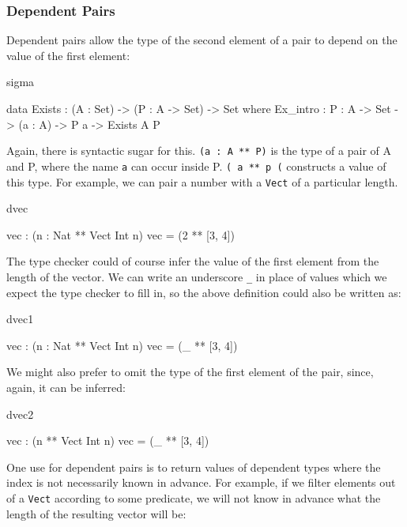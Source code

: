 \subsubsection*{Dependent Pairs}

Dependent pairs allow the type of the second element of a pair to depend on
the value of the first element:

\begin{SaveVerbatim}{sigma}

data Exists : (A : Set) -> (P : A -> Set) -> Set where
   Ex_intro : {P : A -> Set} -> (a : A) -> P a -> Exists A P

\end{SaveVerbatim}

\noindent
Again, there is syntactic sugar for this. \texttt{(a : A ** P)} is the type of a pair of
A and P, where the name \texttt{a} can occur inside P. \texttt{( a ** p (} 
constructs a value of this type. For example, we can pair a number with a 
\texttt{Vect} of a particular length.

\begin{SaveVerbatim}{dvec}

vec : (n : Nat ** Vect Int n)
vec = (2 ** [3, 4])

\end{SaveVerbatim}

\noindent
The type checker could of course infer the value of the first element from the
length of the vector. We can write an underscore \texttt{\_} in place of values which we
expect the type checker to fill in, so the above definition could also be
written as:

\begin{SaveVerbatim}{dvec1}

vec : (n : Nat ** Vect Int n)
vec = (_ ** [3, 4])

\end{SaveVerbatim}

\noindent
We might also prefer to omit the type of the first element of the pair, since,
again, it can be inferred:

\begin{SaveVerbatim}{dvec2}

vec : (n ** Vect Int n)
vec = (_ ** [3, 4])

\end{SaveVerbatim}

\noindent
One use for dependent pairs is to return values of dependent types where the
index is not necessarily known in advance. For example, if we filter elements
out of a \texttt{Vect} according to some predicate, we will not know in advance what the
length of the resulting vector will be:

